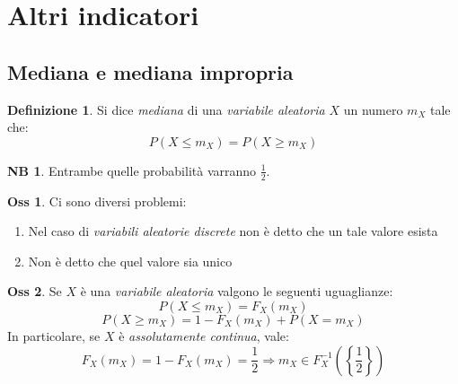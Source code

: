 \documentclass[12pt, a4paper]{report}
\theoremstyle{definition}
\newtheorem{definition}{Definizione}[section]
\newtheorem*{observation}{Oss}
\newtheorem*{note}{NB}
\begin{document}
\section{Altri indicatori}
\subsection{Mediana e mediana impropria}
\begin{definition}
	Si dice \emph{mediana} di una \emph{variabile aleatoria} $X$ un numero $m_X$
	tale che:
	\[P(X\leq m_X)=P(X\geq m_X)\]
\end{definition}
\begin{note}
	Entrambe quelle probabilità varranno $\frac{1}{2}$.
\end{note}
\begin{observation}
	Ci sono diversi problemi:
	\begin{enumerate}[label=(\roman*)]
		\item Nel caso di \emph{variabili aleatorie discrete} non è detto che un
		tale valore esista
		\item Non è detto che quel valore sia unico
	\end{enumerate}
\end{observation}

\begin{observation}
	Se $X$ è una \emph{variabile aleatoria} valgono le seguenti uguaglianze:
	\[P(X\leq m_X)=F_X(m_X)\]
	\[P(X\geq m_X)=1-F_X(m_X)+P(X=m_X)\]
	In particolare, se $X$ è \emph{assolutamente continua}, vale:
	\[F_X(m_X)=1-F_X(m_X)=\frac{1}{2}\Rightarrow m_X\in F_X^{-1}\left(\left\{\frac{1}{2}\right\}\right)\]
\end{observation}
\end{document}
